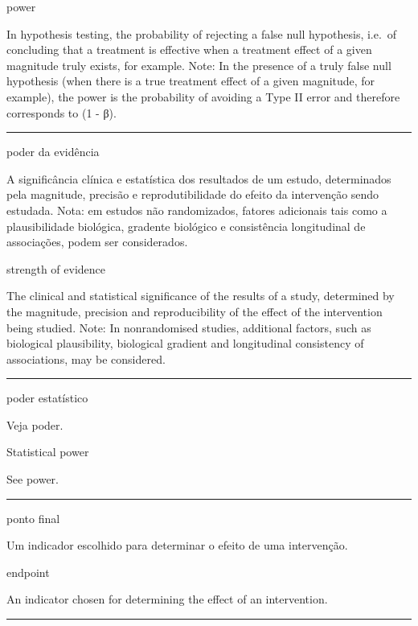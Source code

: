 \documentclass[
  openany]{book}
\begin{document}
power

In hypothesis testing, the probability of rejecting a false null hypothesis, i.e.~of concluding that a treatment is effective when a treatment effect of a given magnitude truly exists, for example. Note: In the presence of a truly false null hypothesis (when there is a true treatment effect of a given magnitude, for example), the power is the probability of avoiding a Type II error and therefore corresponds to (1 - β).

\begin{center}\rule{0.5\linewidth}{0.5pt}\end{center}

poder da evidência

A significância clínica e estatística dos resultados de um estudo, determinados pela magnitude, precisão e reprodutibilidade do efeito da intervenção sendo estudada. Nota: em estudos não randomizados, fatores adicionais tais como a plausibilidade biológica, gradente biológico e consistência longitudinal de associações, podem ser considerados.

strength of evidence

The clinical and statistical significance of the results of a study, determined by the magnitude, precision and reproducibility of the effect of the intervention being studied. Note: In nonrandomised studies, additional factors, such as biological plausibility, biological gradient and longitudinal consistency of associations, may be considered.

\begin{center}\rule{0.5\linewidth}{0.5pt}\end{center}

poder estatístico

Veja poder.

Statistical power

See power.

\begin{center}\rule{0.5\linewidth}{0.5pt}\end{center}

ponto final

Um indicador escolhido para determinar o efeito de uma intervenção.

endpoint

An indicator chosen for determining the effect of an intervention.

\begin{center}\rule{0.5\linewidth}{0.5pt}\end{center}
\end{document}
